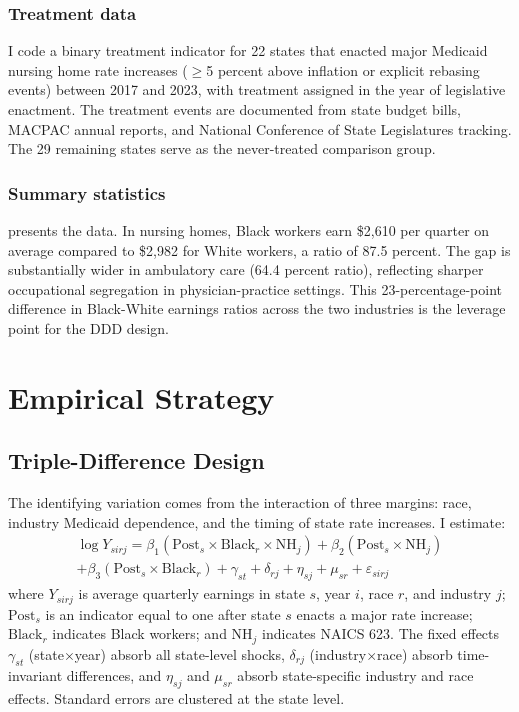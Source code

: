 \documentclass[12pt]{article}
\begin{document}
\subsubsection*{Treatment data}  I code a binary treatment indicator for 22 states that enacted major Medicaid nursing home rate increases ($\geq$5 percent above inflation or explicit rebasing events) between 2017 and 2023, with treatment assigned in the year of legislative enactment. The treatment events are documented from state budget bills, MACPAC annual reports, and National Conference of State Legislatures tracking. The 29 remaining states serve as the never-treated comparison group.

\subsubsection*{Summary statistics}   presents the data. In nursing homes, Black workers earn \$2,610 per quarter on average compared to \$2,982 for White workers, a ratio of 87.5 percent. The gap is substantially wider in ambulatory care (64.4 percent ratio), reflecting sharper occupational segregation in physician-practice settings. This 23-percentage-point difference in Black-White earnings ratios across the two industries is the leverage point for the DDD design.



\section{Empirical Strategy}

\subsection{Triple-Difference Design}

The identifying variation comes from the interaction of three margins: race, industry Medicaid dependence, and the timing of state rate increases. I estimate:
\begin{multline}
\log Y_{sirj} = \beta_1 (\text{Post}_{s} \times \text{Black}_{r} \times \text{NH}_{j}) + \beta_2 (\text{Post}_{s} \times \text{NH}_{j}) \\
+ \beta_3 (\text{Post}_{s} \times \text{Black}_{r}) + \gamma_{st} + \delta_{rj} + \eta_{sj} + \mu_{sr} + \varepsilon_{sirj}
\label{eq:ddd}
\end{multline}
where $Y_{sirj}$ is average quarterly earnings in state $s$, year $i$, race $r$, and industry $j$; $\text{Post}_s$ is an indicator equal to one after state $s$ enacts a major rate increase; $\text{Black}_r$ indicates Black workers; and $\text{NH}_j$ indicates NAICS 623. The fixed effects $\gamma_{st}$ (state$\times$year) absorb all state-level shocks, $\delta_{rj}$ (industry$\times$race) absorb time-invariant differences, and $\eta_{sj}$ and $\mu_{sr}$ absorb state-specific industry and race effects. Standard errors are clustered at the state level.
\end{document}
